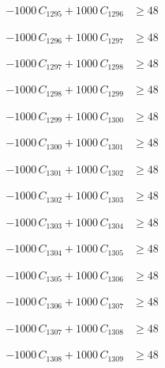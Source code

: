 \documentclass[a4paper,11pt]{article}
\begin{document}
\begin{align}
-1000\,C_{1295} + 1000\,C_{1296} &\geq 48 \nonumber
\end{align}

\begin{align}
-1000\,C_{1296} + 1000\,C_{1297} &\geq 48 \nonumber
\end{align}

\begin{align}
-1000\,C_{1297} + 1000\,C_{1298} &\geq 48 \nonumber
\end{align}

\begin{align}
-1000\,C_{1298} + 1000\,C_{1299} &\geq 48 \nonumber
\end{align}

\begin{align}
-1000\,C_{1299} + 1000\,C_{1300} &\geq 48 \nonumber
\end{align}

\begin{align}
-1000\,C_{1300} + 1000\,C_{1301} &\geq 48 \nonumber
\end{align}

\begin{align}
-1000\,C_{1301} + 1000\,C_{1302} &\geq 48 \nonumber
\end{align}

\begin{align}
-1000\,C_{1302} + 1000\,C_{1303} &\geq 48 \nonumber
\end{align}

\begin{align}
-1000\,C_{1303} + 1000\,C_{1304} &\geq 48 \nonumber
\end{align}

\begin{align}
-1000\,C_{1304} + 1000\,C_{1305} &\geq 48 \nonumber
\end{align}

\begin{align}
-1000\,C_{1305} + 1000\,C_{1306} &\geq 48 \nonumber
\end{align}

\begin{align}
-1000\,C_{1306} + 1000\,C_{1307} &\geq 48 \nonumber
\end{align}

\begin{align}
-1000\,C_{1307} + 1000\,C_{1308} &\geq 48 \nonumber
\end{align}

\begin{align}
-1000\,C_{1308} + 1000\,C_{1309} &\geq 48 \nonumber
\end{align}
\end{document}
